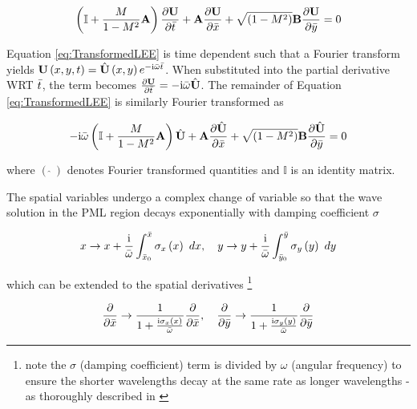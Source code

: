 \begin{equation} \label{eq:TransformedLEE}
    \left( \mathbb{I} + \frac{M}{1-M^2} \mathbf{A} \right) \frac{\partial \mathbf{U}}{\partial \Bar{t}} + \mathbf{A} \frac{\partial \mathbf{U}}{\partial \Bar{x}} + \sqrt{\left(1-M^2\right)} \mathbf{B} \frac{\partial \mathbf{U}}{\partial \Bar{y}} = 0
\end{equation}

Equation \ref{eq:TransformedLEE} is time dependent such that a Fourier transform yields $\mathbf{U}\left(x,y,t\right)=\hat{\mathbf{U}}\left(x,y\right)e^{-\mathrm{i} \Bar{\omega}\Bar{t}}$. When substituted into the partial derivative WRT $\Bar{t}$, the term becomes $\frac{\partial \mathbf{U}}{\partial \Bar{t}}=- \mathrm{i} \Bar{\omega} \hat{\mathbf{U}}$. The remainder of Equation \ref{eq:TransformedLEE} is similarly Fourier transformed as


\begin{equation} \label{eq:FourierLEE}
    -\mathrm{i} \Bar{\omega} \left( \mathbb{I} + \frac{M}{1-M^2} \mathbf{A} \right) \hat{\mathbf{U}} + \mathbf{A} \frac{\partial \hat{\mathbf{U}}}{\partial \Bar{x}} + \sqrt{\left(1-M^2\right)} \mathbf{B} \frac{\partial \hat{\mathbf{U}}}{\partial \Bar{y}} = 0
\end{equation}

where $\left(\ \hat{} \ \right)$ denotes Fourier transformed quantities and $\mathbb{I}$ is an identity matrix.


The spatial variables undergo a complex change of variable so that the wave solution in the PML region decays exponentially with damping coefficient $\sigma$

\begin{equation} \label{eq:ComplexChange}
    x \rightarrow x + \frac{\mathrm{i}}{\Bar{\omega}} \int^{\Bar{x}}_{\Bar{x}_0} \sigma_{x} \left( x \right) \ dx , \quad y \rightarrow y + \frac{\mathrm{i}}{\Bar{\omega}} \int^{\Bar{y}}_{\Bar{y}_0} \sigma_{y} \left( y \right) \ dy
\end{equation}

which can be extended to the spatial derivatives \footnote[2]{note the $\sigma$ (damping coefficient) term is divided by $\omega$ (angular frequency) to ensure the shorter wavelengths decay at the same rate as longer wavelengths - as thoroughly described in \cite{johnson2021notesonPML}}

\begin{equation}
    \frac{\partial}{\partial \Bar{x}} \rightarrow \frac{1}{1 + \frac{\mathrm{i} \sigma_x \left( x \right)}{\Bar{\omega}}} \frac{\partial}{\partial \Bar{x}}, \quad \frac{\partial}{\partial \Bar{y}} \rightarrow \frac{1}{1 + \frac{\mathrm{i} \sigma_y \left( y \right)}{\Bar{\omega}}} \frac{\partial}{\partial \Bar{y}}
\end{equation}



